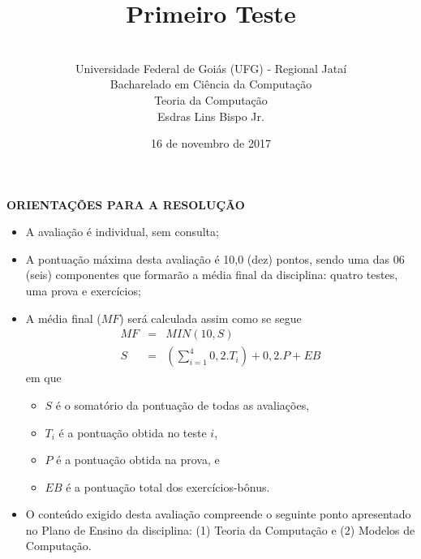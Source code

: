 \documentclass[12pt,a4paper,oneside]{article}
\author{\\Universidade Federal de Goiás (UFG) - Regional  Jataí\\Bacharelado em Ciência da Computação \\Teoria da Computação \\Esdras Lins Bispo Jr.}
\date{16 de novembro de 2017}
\title{\sc \huge Primeiro Teste}
\begin{document}
\maketitle

{\bf ORIENTAÇÕES PARA A RESOLUÇÃO}

\small
 
\begin{itemize}
	\item A avaliação é individual, sem consulta;
	\item A pontuação máxima desta avaliação é 10,0 (dez) pontos, sendo uma das 06 (seis) componentes que formarão a média final da disciplina: quatro testes, uma prova e exercícios;
	\item A média final ($MF$) será calculada assim como se segue
	\begin{eqnarray}
		MF & = & MIN(10, S) \nonumber \\
		S & = & (\sum_{i=1}^{4} 0,2.T_i ) + 0,2.P  + EB\nonumber
	\end{eqnarray}
	em que 
	\begin{itemize}
		\item $S$ é o somatório da pontuação de todas as avaliações,
		\item $T_i$ é a pontuação obtida no teste $i$,
		\item $P$ é a pontuação obtida na prova, e
		\item $EB$ é a pontuação total dos exercícios-bônus.
	\end{itemize}
	\item O conteúdo exigido desta avaliação compreende o seguinte ponto apresentado no Plano de Ensino da disciplina: (1) Teoria da Computação e (2) Modelos de Computação.
\end{itemize}

\begin{center}
\end{center}

\newpage
\end{document}

